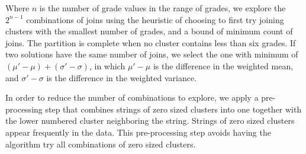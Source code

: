 Where $n$ is the number of grade values in the range of grades,
we explore the $2^{n-1}$ combinations of joins using the heuristic
of choosing to first try joining clusters with the smallest number of grades,
and a bound of minimum count of joins. The partition
is complete when no cluster contains less than six grades. If two solutions
have the same number of joins, we select the one with minimum of
$(\mu' - \mu) + (\sigma' - \sigma)$, in which
$\mu' - \mu$ is
the difference in the weighted mean, and
$\sigma' - \sigma$ is
the difference in the weighted variance.

In order to reduce the number of combinations to explore, we apply a
pre-processing step that combines strings of zero sized clusters into
one together with the lower numbered cluster neighboring the string.
Strings of zero sized clusters appear frequently in the data.
This pre-processing step
avoids having the algorithm try all combinations of zero sized clusters.
